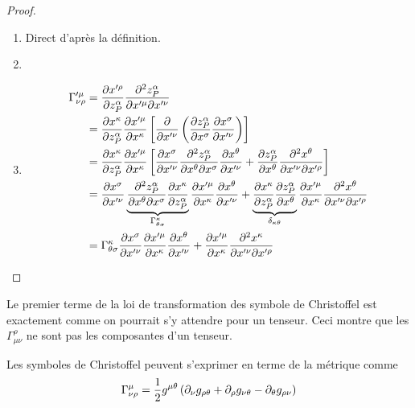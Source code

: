 \documentclass[a4paper,11pt]{report}
\begin{document}
            \begin{proof}${}$\\
            \begin{enumerate}[label = \textit{\roman*)}]
                \item Direct d'après la définition.
                \item ${}$\\
                \comp
                \item \begin{align}
                    \Gamma'^\mu_{\nu\rho} &= \frac{\partial x'^\rho}{\partial z^\alpha_P}\frac{\partial^2 z^\alpha_P}{\partial x'^\mu\partial x'^\nu} \\
                    &= \frac{\partial x^\kappa}{\partial z^\alpha_P}\frac{\partial x'^\mu}{\partial x^\kappa}\left[ \frac{\partial}{\partial x'^\nu}\left( \frac{\partial z^\alpha_P}{\partial x^\sigma}\frac{\partial x^\sigma}{\partial x'^\nu} \right) \right] \\
                    &= \frac{\partial x^\kappa}{\partial z^\alpha_P}\frac{\partial x'^\mu}{\partial x^\kappa}\left[\frac{\partial x^\sigma}{\partial x'^\nu} \frac{\partial^2 z^\alpha_P}{\partial x^\theta\partial x^\sigma}\frac{\partial x^\theta}{\partial x'^\nu} + \frac{\partial z^\alpha_P}{\partial x^\theta}\frac{\partial^2 x^\theta}{\partial x'^\nu\partial x'^\rho} \right]\\
                    &= \frac{\partial x^\sigma}{\partial x'^\nu} \underbrace{\frac{\partial^2 z^\alpha_P}{\partial x^\theta\partial x^\sigma}\frac{\partial x^\kappa}{\partial z^\alpha_P}}_{\Gamma^\kappa_{\theta\sigma}}\frac{\partial x'^\mu}{\partial x^\kappa}\frac{\partial x^\theta}{\partial x'^\nu} +  \underbrace{\frac{\partial x^\kappa}{\partial z^\alpha_P}\frac{\partial z^\alpha_P}{\partial x^\theta}}_{\delta_{\kappa\theta}}\frac{\partial x'^\mu}{\partial x^\kappa}\frac{\partial^2 x^\theta}{\partial x'^\nu\partial x'^\rho}\\
                    &= \Gamma^\kappa_{\theta\sigma}\frac{\partial x^\sigma}{\partial x'^\nu} \frac{\partial x'^\mu}{\partial x^\kappa}\frac{\partial x^\theta}{\partial x'^\nu} +  \frac{\partial x'^\mu}{\partial x^\kappa}\frac{\partial^2 x^\kappa}{\partial x'^\nu\partial x'^\rho}\\
                \end{align}
            \end{enumerate}
            \end{proof}
            
            Le premier terme de la loi de transformation des symbole de Christoffel est exactement comme on pourrait s'y attendre pour un tenseur. Ceci montre que les $\Gamma^\rho_{\mu\nu}$ ne sont pas les composantes d'un tenseur.
            
            \begin{prop}\begin{leftbar}
                Les symboles de Christoffel peuvent s'exprimer en terme de la métrique comme
                \begin{equation}\label{eq:gammag}
                    \Gamma^\mu_{\nu\rho} = \frac{1}{2}g^{\mu\theta}\left( \partial_\nu g_{\rho\theta}+\partial_\rho g_{\nu\theta}-\partial_\theta g_{\rho\nu} \right)
                \end{equation}
            \end{leftbar}\end{prop}
            
\end{document}
